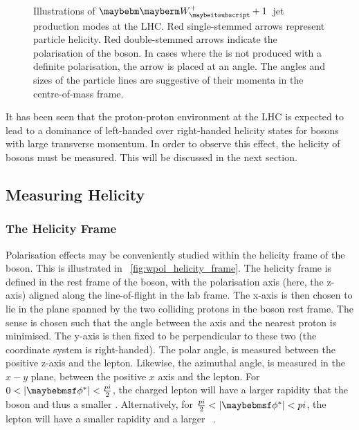 \begin{figure}
\centering
{}\quad
{}\quad
{}\\
\quad
{}\quad
{}
\caption[Illustrations of $\PWplus+1$~jet production modes at the
\acs{LHC}]{Illustrations of $\PWplus+1$~jet production modes at the LHC. Red
  single-stemmed arrows represent particle helicity. Red double-stemmed arrows
  indicate the polarisation of the \PW boson. In cases where the \PW is not
  produced with a definite polarisation, the arrow is placed at an angle. The
  angles and sizes of the particle lines are suggestive of their momenta in the
  centre-of-mass frame.}
\label{fig:w1jet_modes}
\end{figure}

It has been seen that the proton-proton environment at the \ac{LHC} is expected
to lead to a dominance of left-handed over right-handed helicity states for \PW
bosons with large transverse momentum. In order to observe this effect, the
helicity of \PW bosons must be measured. This will be discussed in the next section.

\subsection{Measuring Helicity}
\subsubsection{The Helicity Frame}
Polarisation effects may be conveniently studied within the helicity
frame of the \PW boson. This is illustrated in
\fig~\ref{fig:wpol_helicity_frame}. The helicity frame is defined in
the rest frame of the \PW boson, with the polarisation axis (here, the
z-axis) aligned along the \PW line-of-flight in the lab frame. The
x-axis is then chosen to lie in the plane spanned by the two colliding
protons in the boson rest frame. The sense is chosen such that the
angle between the axis and the nearest proton is minimised. The y-axis
is then fixed to be perpendicular to these two (the coordinate system
is right-handed). The polar angle, \thetastar is measured between the
positive z-axis and the lepton. Likewise, the azimuthal angle,
\phistar is measured in the $x-y$ plane, between the positive $x$ axis
and the lepton. For $0 < |\phistar| < \frac{\pi}{2}$, the charged
lepton will have a larger rapidity that the \PW boson and thus a
smaller \Pt. Alternatively, for $\frac{\pi}{2} < |\phistar| < \pi$,
the lepton will have a smaller rapidity and a larger \Pt~\cite{wpol_an}.

